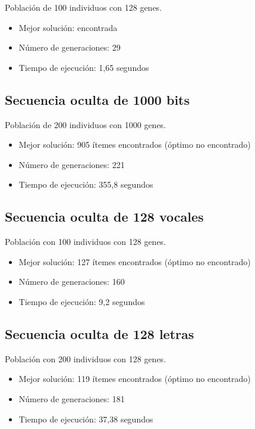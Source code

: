 \documentclass[letterpaper,11pt]{article} %
\begin{document}
Población de 100 individuos con 128 genes.

\begin{itemize}
\item Mejor solución: encontrada
\item Número de generaciones: 29
\item Tiempo de ejecución: 1,65 segundos
\end{itemize}


\subsection{Secuencia oculta de 1000 bits}
Población de 200 individuos con 1000 genes.

\begin{itemize}
\item Mejor solución: 905 ítemes encontrados (óptimo no encontrado)
\item Número de generaciones: 221
\item Tiempo de ejecución: 355,8 segundos
\end{itemize}


\subsection{Secuencia oculta de 128 vocales}
Población con 100 individuos con 128 genes.

\begin{itemize}
\item Mejor solución: 127 ítemes encontrados (óptimo no encontrado)
\item Número de generaciones: 160
\item Tiempo de ejecución: 9,2 segundos
\end{itemize}


\subsection{Secuencia oculta de 128 letras}
Población con 200 individuos con 128 genes.

\begin{itemize}
\item Mejor solución: 119 ítemes encontrados (óptimo no encontrado)
\item Número de generaciones: 181
\item Tiempo de ejecución: 37,38 segundos
\end{itemize}
\end{document}
